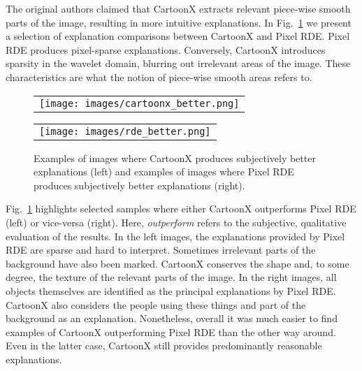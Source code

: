 The original authors claimed that CartoonX extracts relevant piece‐wise smooth parts of the image, resulting in more intuitive explanations.
In Fig.~\ref{fig:qual_comp} we present a selection of explanation comparisons between CartoonX and Pixel RDE.
Pixel RDE produces pixel-sparse explanations.
Conversely, CartoonX introduces sparsity in the wavelet domain, blurring out irrelevant areas of the image.
These characteristics are what the notion of piece-wise smooth areas refers to.

\begin{figure}
    \centering
    \begin{tabular}{@{}c@{}}
        \texttt{[image: images/cartoonx\_better.png]}
    \end{tabular}
    \hspace{5mm}
    \begin{tabular}{@{}c@{}}
        \texttt{[image: images/rde\_better.png]}
    \end{tabular}
    \caption{Examples of images where CartoonX produces subjectively better explanations (left) and examples of images where Pixel RDE produces subjectively better explanations (right).}
    \label{fig:qual_comp}
\end{figure}

Fig.~\ref{fig:qual_comp} highlights selected samples where either CartoonX outperforms Pixel RDE (left) or vice-versa (right).
Here, \textit{outperform} refers to the subjective, qualitative evaluation of the results.
In the left images, the explanations provided by Pixel RDE are sparse and hard to interpret.
Sometimes irrelevant parts of the background have also been marked.
CartoonX conserves the shape and, to some degree, the texture of the relevant parts of the image.
In the right images, all objects themselves are identified as the principal explanations by Pixel RDE.
CartoonX also considers the people using these things and part of the background as an explanation.
Nonetheless, overall it was much easier to find examples of CartoonX outperforming Pixel RDE than the other way around.
Even in the latter case, CartoonX still provides predominantly reasonable explanations.

